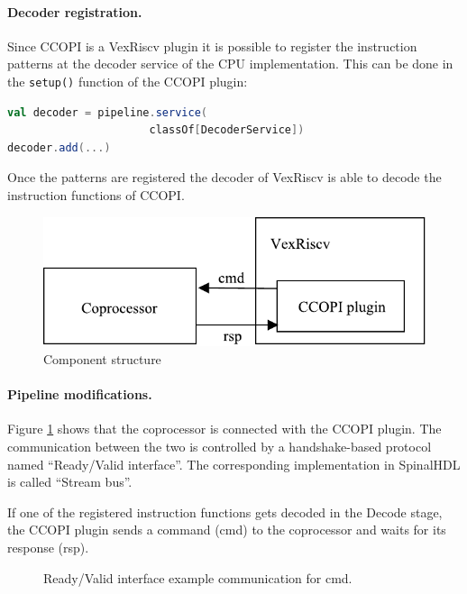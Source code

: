 \documentclass[twoside,twocolumn]{article}
\newcommand{\code}[1]{\texttt{#1}}
\begin{document}
\paragraph{Decoder registration.} Since CCOPI is a VexRiscv plugin it is possible to register the
instruction patterns at the decoder service of the CPU implementation.
This can be done in the \code{setup()} function of the CCOPI plugin:
\begin{lstlisting}[language=scala]
val decoder = pipeline.service(
                      classOf[DecoderService])
decoder.add(...)
\end{lstlisting}
Once the patterns are registered the decoder of VexRiscv is able to
decode the instruction functions of CCOPI.

\begin{figure}[ht]
    \includegraphics[scale=0.68]{ccopi_plugin}
    \caption{Component structure}
    \label{fig:component_structure}
\end{figure}

\paragraph{Pipeline modifications.}
Figure \ref*{fig:component_structure} shows that the coprocessor 
is connected with the CCOPI plugin. The communication between the 
two is controlled
by a handshake-based protocol named ``Ready/Valid interface''. The
corresponding implementation in SpinalHDL is called ``Stream bus''. 

If one of the registered instruction functions gets decoded in the
Decode stage, the CCOPI plugin sends a command (cmd) to the
coprocessor and waits for its response (rsp).
\begin{figure}
    
    \caption{Ready/Valid interface example communication for cmd.}
    \label{fig:ready_valid}
\end{figure}
\end{document}
